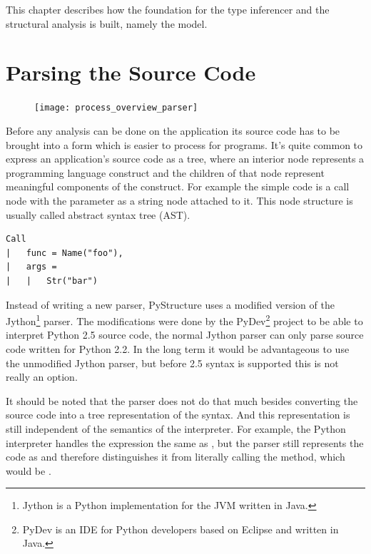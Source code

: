 \documentclass[12pt,halfparskip,DIV11,BCOR10mm]{scrreprt}
\begin{document}
This chapter describes how the foundation for the type inferencer and the structural analysis is built, namely the model.

\section{Parsing the Source Code}

\begin{figure}
    \vspace{-0.6cm}
    \texttt{[image: process\_overview\_parser]}
\end{figure}

Before any analysis can be done on the application its source code has to be brought into a form which is easier to process for programs. It's quite common to express an application's source code as a tree, where an interior node represents a programming language construct and the children of that node represent meaningful components of the construct. For example the simple code  is a call node with the parameter as a string node attached to it. This node structure is usually called abstract syntax tree (AST).

\begin{lstlisting}
Call
|   func = Name("foo"),
|   args = 
|   |   Str("bar")
\end{lstlisting}

Instead of writing a new parser, PyStructure uses a modified version of the Jython\footnote{Jython is a Python implementation for the JVM written in Java.} parser. The modifications were done by the PyDev\footnote{PyDev is an IDE for Python developers based on Eclipse and written in Java.} project to be able to interpret Python 2.5 source code, the normal Jython parser can only parse source code written for Python 2.2. In the long term it would be advantageous to use the unmodified Jython parser, but before 2.5 syntax is supported this is not really an option.

It should be noted that the parser does not do that much besides converting the source code into a tree representation of the syntax. And this representation is still independent of the semantics of the interpreter. For example, the Python interpreter handles the expression  the same as , but the parser still represents the code as  and therefore distinguishes it from literally calling the  method, which would be .
\end{document}
